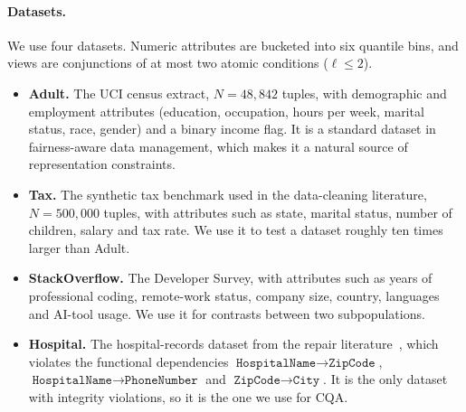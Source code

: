 \paragraph{Datasets.}
We use four datasets.
Numeric attributes are bucketed into six quantile bins, and views are conjunctions of at most two atomic conditions ($\ell\le2$).
\begin{itemize}[leftmargin=*,itemsep=1pt,topsep=2pt]
  \item \textbf{Adult.} The UCI census extract, $N=48{,}842$ tuples, with demographic and employment attributes (education, occupation, hours per week, marital status, race, gender) and a binary income flag. It is a standard dataset in fairness-aware data management, which makes it a natural source of representation constraints.
  \item \textbf{Tax.} The synthetic tax benchmark used in the data-cleaning literature, $N=500{,}000$ tuples, with attributes such as state, marital status, number of children, salary and tax rate. We use it to test a dataset roughly ten times larger than Adult.
  \item \textbf{StackOverflow.} The Developer Survey, with attributes such as years of professional coding, remote-work status, company size, country, languages and AI-tool usage. We use it for contrasts between two subpopulations.
  \item \textbf{Hospital.} The hospital-records dataset from the repair literature~\cite{rekatsinas2017}, which violates the functional dependencies $\texttt{HospitalName}\rightarrow\texttt{ZipCode}$, $\texttt{HospitalName}\rightarrow\texttt{PhoneNumber}$ and $\texttt{ZipCode}\rightarrow\texttt{City}$. It is the only dataset with integrity violations, so it is the one we use for CQA.
\end{itemize}

